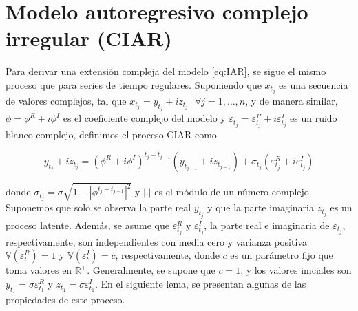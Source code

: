 


\section{Modelo autoregresivo complejo irregular (CIAR)}
\label{section:CIAR}

Para derivar una extensión compleja del modelo \ref{eq:IAR}, se sigue el mismo proceso que para series de tiempo regulares. Suponiendo que $x_{t_{j}}$ es una secuencia de valores complejos, 
tal que $x_{t_{j}}=y_{t_{j}}+i z_{t_{j}} \text{ } \forall j=1, \ldots, n$, y de manera similar, $\phi=\phi^{R}+i \phi^{I}$ es el coeficiente complejo del modelo 
y $\varepsilon_{t_{j}}=\varepsilon_{t_{j}}^{R}+i \varepsilon_{t_{j}}^{I}$ es un ruido blanco complejo, definimos el proceso CIAR como

\begin{equation}
	y_{t_{j}}+i z_{t_{j}}=\left(\phi^{R}+i \phi^{I}\right)^{t_{j}-t_{j-1}}\left(y_{t_{j-1}}+i z_{t_{j-1}}\right)+\sigma_{t_{j}}\left(\varepsilon_{t_{j}}^{R}+i \varepsilon_{t_{j}}^{I}\right)
	\label{eq:CIAR}
\end{equation}

donde $\sigma_{t_{j}}=\sigma \sqrt{1-\left|\phi^{t_{j}-t_{j-1}}\right|^{2}}$ y $|$.$|$ es el módulo de un número complejo. 
Suponemos que solo se observa la parte real $y_{t_{j}}$ y que la parte imaginaria $z_{t_{j}}$ es un proceso latente. Además, se asume que $\varepsilon_{t_{j}}^{R}$ y $\varepsilon_{t_{j}}^{I}$, 
la parte real e imaginaria de $\varepsilon_{t_{j}}$, respectivamente, son independientes con media cero y varianza positiva $\mathbb{V}\left(\varepsilon_{t}^{R}\right)=1$ y $\mathbb{V}\left(\varepsilon_{t}^{I}\right)=c$, 
respectivamente, donde $c$ es un parámetro fijo que toma valores en $\mathbb{R}^{+}$. Generalmente, se supone que $c=1$, y los valores iniciales son $y_{t_{1}}=\sigma \varepsilon_{t_{1}}^{R}$ y $z_{t_{1}}=\sigma \varepsilon_{t_{1}}^{I}$.
En el siguiente lema, se presentan algunas de las propiedades de este proceso.

